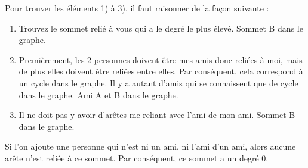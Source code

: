 \begin{Exercice}[10 minutes]
\begin{solution}
        Pour trouver les éléments 1) à 3), il faut raisonner de la façon suivante :
        \begin{enumerate}
            \item Trouvez le sommet relié à vous qui a le degré le plus élevé. Sommet B dans le graphe.
            \item Premièrement, les 2 personnes doivent être mes amis donc reliées à moi, mais de  plus elles doivent être reliées entre elles. Par conséquent, cela correspond à un cycle dans le graphe. Il y a autant d'amis qui se connaissent que de cycle dans le graphe. Ami A et B dans le graphe.
            \item Il ne doit pas y avoir d'arêtes me reliant avec l'ami de mon ami. Sommet B dans le graphe.
        \end{enumerate}
        
        Si l'on ajoute une personne qui n'est ni un ami, ni l'ami d'un ami, alors aucune arête n'est reliée à ce sommet. Par conséquent, ce sommet a un degré 0.
    \end{solution} 
\end{Exercice}

